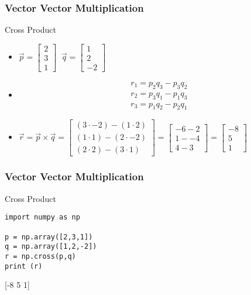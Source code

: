  \begin{frame}[fragile] \frametitle{Vector Vector Multiplication}
Cross Product
 \begin{itemize}
 
\item $\vec{p} = \begin{bmatrix}2 \\ 3 \\ 1 \end{bmatrix}\;\; \vec{q} = \begin{bmatrix}1 \\ 2 \\ -2 \end{bmatrix}$
\item \begin{align}r_{1} = p_{2}q_{3} - p_{3}q_{2} \\ r_{2} = p_{3}q_{1} - p_{1}q_{3} \\ r_{3} = p_{1}q_{2} - p_{2}q_{1} \end{align}
\item $\vec{r} = \vec{p} \times \vec{q} = \begin{bmatrix}(3 \cdot -2) - (1 \cdot 2) \\ (1 \cdot 1) - (2 \cdot -2) \\ (2 \cdot 2) - (3 \cdot 1) \end{bmatrix} = \begin{bmatrix}-6 - 2 \\ 1 - -4 \\ 4 - 3 \end{bmatrix} = \begin{bmatrix}-8 \\ 5 \\ 1 \end{bmatrix}$
\end{itemize}
 
\end{frame}


 \begin{frame}[fragile] \frametitle{Vector Vector Multiplication}

Cross Product
 
 \begin{lstlisting}
import numpy as np

p = np.array([2,3,1])
q = np.array([1,2,-2])
r = np.cross(p,q)
print (r)
 \end{lstlisting}
 
[-8  5  1]
\end{frame}

